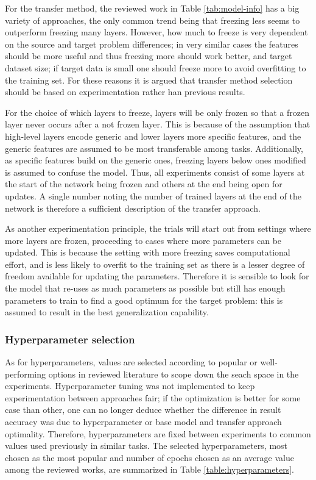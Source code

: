\documentclass{article}
\begin{document}
For the transfer method, the reviewed work in Table \ref{tab:model-info} has a big variety of approaches, 
the only common trend being that freezing less seems to outperform freezing many layers. 
However, how much to freeze is very dependent on the source and target problem differences;
in very similar cases the features should be more useful and thus freezing more should work better, 
and target dataset size; if target data is small one should freeze more to avoid overfitting 
to the training set. For these reasons it is argued that transfer method selection should be
based on experimentation rather han previous results.

For the choice of which layers to freeze, layers will be only frozen so that a frozen layer never 
occurs after a not frozen layer. This is because of the assumption that high-level layers 
encode generic and lower layers more specific features, and the generic features are assumed to be most transferable among tasks.
 Additionally, as specific features build on the generic ones, freezing layers 
below ones modified is assumed to confuse the model. Thus, all experiments consist of some layers 
at the start of the network being frozen and others at the end being open for updates.
A single number noting the number of trained layers at the end of the network is therefore 
a sufficient description of the transfer approach.

As another experimentation principle, the trials will start out from settings where more layers are frozen, proceeding to
cases where more parameters can be updated. This is because the setting with more freezing saves 
computational effort, and is less likely to overfit to the training set as there is a lesser degree of freedom 
available for updating the parameters. Therefore it is sensible to look for the model that re-uses as 
much parameters as possible but still has enough parameters to train to find a good optimum for the target problem:
this is assumed to result in the best generalization capability.

\subsubsection{Hyperparameter selection}

As for hyperparameters, values are selected according to popular or well-performing 
options in reviewed literature to scope down the seach space in the experiments.
Hyperparameter tuning was not implemented to keep experimentation 
between approaches fair; if the optimization is better for some case than other, one can no 
longer deduce whether the difference in result accuracy was due to hyperparameter or base model and 
transfer approach optimality. Therefore, hyperparameters are fixed between experiments to common values 
used previously in similar tasks. The selected hyperparameters, most chosen as the most popular and 
number of epochs chosen as an average value among the reviewed works, are summarized in Table \ref{table:hyperparameters}.
\end{document}
